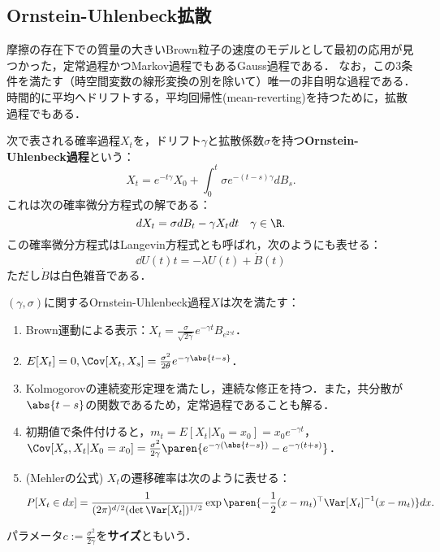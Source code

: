\documentclass[uplatex,dvipdfmx]{jsreport}
\begin{document}
\subsection{Ornstein-Uhlenbeck拡散}

\begin{tcolorbox}[colframe=ForestGreen, colback=ForestGreen!10!white,breakable,colbacktitle=ForestGreen!40!white,coltitle=black,fonttitle=\bfseries\sffamily,
title=]
    摩擦の存在下での質量の大きいBrown粒子の速度のモデルとして最初の応用が見つかった，定常過程かつMarkov過程でもあるGauss過程である．
    なお，この3条件を満たす（時空間変数の線形変換の別を除いて）唯一の非自明な過程である．
    時間的に平均へドリフトする，平均回帰性(mean-reverting)を持つために，拡散過程でもある．
\end{tcolorbox}

\begin{definition}
    次で表される確率過程$X_t$を，ドリフト$\gamma$と拡散係数$\sigma$を持つ\textbf{Ornstein-Uhlenbeck過程}という：
    \[X_t=e^{-t\gamma}X_0+\int^t_0\sigma e^{-(t-s)\gamma}dB_s.\]
    これは次の確率微分方程式の解である：
    \[dX_t=\sigma dB_t-\gamma X_tdt\quad\gamma\in\R.\]
    この確率微分方程式はLangevin方程式とも呼ばれ，次のようにも表せる：
    \[\dd{U(t)}{t}=-\lambda U(t)+\dot{B}(t)\]
    ただし$\dot{B}$は白色雑音である．
\end{definition}

\begin{lemma}
    $(\gamma,\sigma)$に関するOrnstein-Uhlenbeck過程$X$は次を満たす：
    \begin{enumerate}
        \item Brown運動による表示：$X_t=\frac{\sigma}{\sqrt{2\gamma}}e^{-\gamma t}B_{e^{2\gamma t}}$．
        \item $E[X_t]=0,\Cov[X_t,X_s]=\frac{\sigma^2}{2\theta}e^{-\gamma\abs{t-s}}$．
        \item Kolmogorovの連続変形定理を満たし，連続な修正を持つ．また，共分散が$\abs{t-s}$の関数であるため，定常過程であることも解る．
        \item 初期値で条件付けると，$m_t=E[X_t|X_0=x_0]=x_0e^{-\gamma t}$，$\Cov[X_s,X_t|X_0=x_0]=\frac{\sigma^2}{2\gamma}\paren{e^{-\gamma(\abs{t-s})}-e^{-\gamma(t+s)}}$．
        \item (Mehlerの公式) $X_t$の遷移確率は次のように表せる：
        \[P[X_t\in dx]=\frac{1}{(2\pi)^{d/2}(\det\Var[X_t])^{1/2}}\exp\paren{-\frac{1}{2}(x-m_t)^\top\Var[X_t]^{-1}(x-m_t)}dx.\]
    \end{enumerate}
    パラメータ$c:=\frac{\sigma^2}{2\gamma}$を\textbf{サイズ}ともいう．
\end{lemma}
\end{document}
